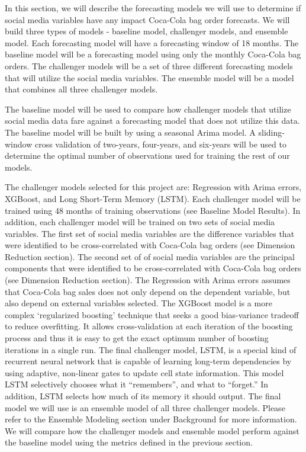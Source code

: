 \documentclass[12pt,oneside]{chicagocapstone}
\begin{document}
In this section, we will describe the forecasting models we will use to determine if social media variables have any impact Coca-Cola bag order forecasts. We will build three types of models - baseline model, challenger models, and ensemble model. Each forecasting model will have a forecasting window of 18 months. The baseline model will be a forecasting model using only the monthly Coca-Cola bag orders. The challenger models will be a set of three different forecasting models that will utilize the social media variables. The ensemble model will be a model that combines all three challenger models.

The baseline model will be used to compare how challenger models that utilize social media data fare against a forecasting model that does not utilize this data. The baseline model will be built by using a seasonal Arima model. A sliding-window cross validation of two-years, four-years, and six-years will be used to determine the optimal number of observations used for training the rest of our models.

The challenger models selected for this project are: Regression with Arima errors, XGBoost, and Long Short-Term Memory (LSTM). Each challenger model will be trained using 48 months of training observations (see Baseline Model Results). In addition, each challenger model will be trained on two sets of social media variables. The first set of social media variables are the difference variables that were identified to be cross-correlated with Coca-Cola bag orders (see Dimension Reduction section). The second set of of social media variables are the principal components that were identified to be cross-correlated with Coca-Cola bag orders (see Dimension Reduction section). The Regression with Arima errors assumes that Coca-Cola bag sales does not only depend on the dependent variable, but also depend on external variables selected. The XGBoost model is a more complex `regularized boosting' technique that seeks a good bias-variance tradeoff to reduce overfitting. It allows cross-validation at each iteration of the boosting process and thus it is easy to get the exact optimum number of boosting iterations in a single run. The final challenger model, LSTM, is a special kind of recurrent neural network that is capable of learning long-term dependencies by using adaptive, non-linear gates to update cell state information. This model LSTM selectively chooses what it ``remembers'', and what to ``forget.'' In addition, LSTM selects how much of its memory it should output.
The final model we will use is an ensemble model of all three challenger models. Please refer to the Ensemble Modeling section under Background for more information. We will compare how the challenger models and ensemble model perform against the baseline model using the metrics defined in the previous section.
\end{document}
